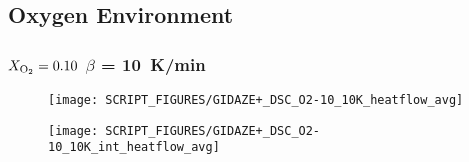 \begin{landscape}
\newpage
\subsection{Oxygen Environment}
\label{DSC_O2}
\subsubsection{$X_{\rm O_2}=0.10$ $\beta$ = 10~K/min}
\begin{minipage}{0.65\textwidth}
\begin{figure}[H]
{\texttt{[image: SCRIPT\_FIGURES/GIDAZE+\_DSC\_O2-10\_10K\_heatflow\_avg]}}\\
\end{figure}
\end{minipage} 
\begin{minipage}{0.35\textwidth}
\begin{figure}[H]
{\texttt{[image: SCRIPT\_FIGURES/GIDAZE+\_DSC\_O2-10\_10K\_int\_heatflow\_avg]}}\\
\end{figure}
\end{minipage}\\
\vfill


\end{landscape}
